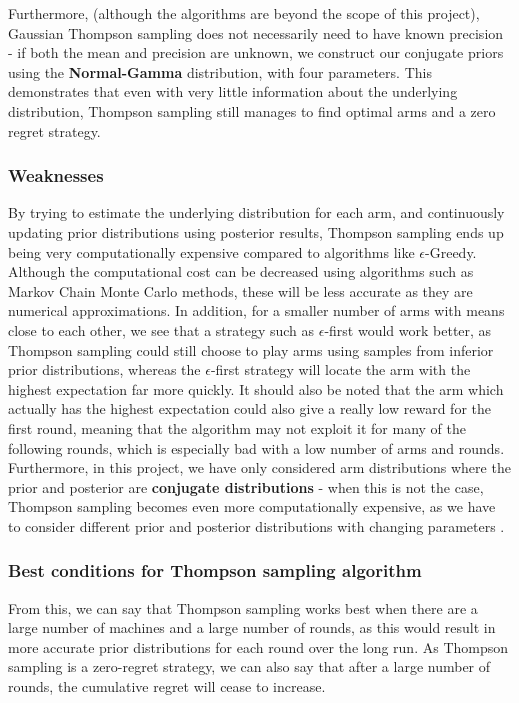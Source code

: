 Furthermore, (although the algorithms are beyond the scope of this project), Gaussian Thompson sampling does not necessarily need to have known precision - if both the mean and precision are unknown, we construct our conjugate priors using the \textbf{Normal-Gamma} distribution, with four parameters. This demonstrates that even with very little information about the underlying distribution, Thompson sampling still manages to find optimal arms and a zero regret strategy.

\subsubsection{Weaknesses}
By trying to estimate the underlying distribution for each arm, and continuously updating prior distributions using posterior results, Thompson sampling ends up being very computationally expensive compared to algorithms like $\epsilon$-Greedy. \citep{mazumdar2020thompson} Although the computational cost can be decreased using algorithms such as Markov Chain Monte Carlo methods, these will be less accurate as they are numerical approximations. \citep{mazumdar2020thompson} In addition, for a smaller number of arms with means close to each other, we see that a strategy such as $\epsilon$-first would work better, as Thompson sampling could still choose to play arms using samples from inferior prior distributions, whereas the $\epsilon$-first strategy will locate the arm with the highest expectation far more quickly. It should also be noted that the arm which actually has the highest expectation could also give a really low reward for the first round, meaning that the algorithm may not exploit it for many of the following rounds, which is especially bad with a low number of arms and rounds. Furthermore, in this project, we have only considered arm distributions where the prior and posterior are \textbf{conjugate distributions} - when this is not the case, Thompson sampling becomes even more computationally expensive, as we have to consider different prior and posterior distributions with changing parameters \citep{zhou2018racing}.

\subsubsection{Best conditions for Thompson sampling algorithm}
From this, we can say that Thompson sampling works best when there are a large number of machines and a large number of rounds, as this would result in more accurate prior distributions for each round over the long run. As Thompson sampling is a zero-regret strategy, we can also say that after a large number of rounds, the cumulative regret will cease to increase. 

